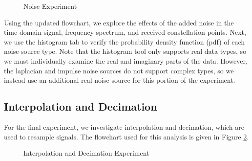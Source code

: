 \documentclass{article}
\begin{document}
\begin{figure}[H]
	\centerline{}
	\caption{Noise Experiment}
	\label{fig::noise_experiment}
\end{figure}

Using the updated flowchart, we explore the effects of the added noise in the time-domain signal, frequency spectrum, and received constellation points. Next, we use the histogram tab to verify the probability density function (pdf) of each noise source type. Note that the histogram tool only supports real data types, so we must individually examine the real and imaginary parts of the data. However, the laplacian and impulse noise sources do not support complex types, so we instead use an additional real noise source for this portion of the experiment. 


\subsection{Interpolation and Decimation}

For the final experiment, we investigate interpolation and decimation, which are used to resample signals. The flowchart used for this analysis is given in Figure \ref{fig::interpolation_and_decimation_experiment}.

\begin{figure}[H]
	\centerline{}
	\caption{Interpolation and Decimation Experiment}
	\label{fig::interpolation_and_decimation_experiment}
\end{figure}
\end{document}
